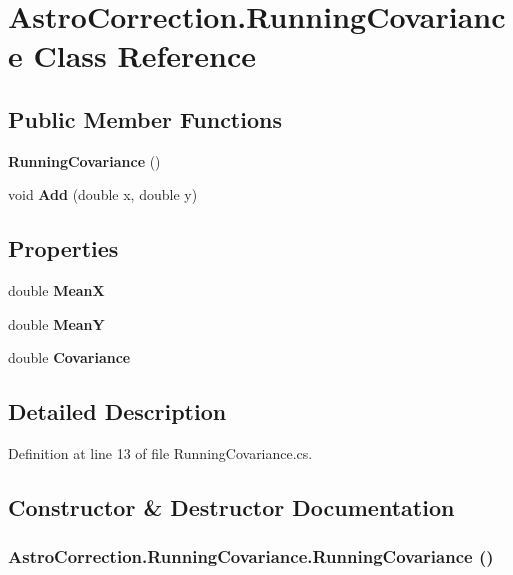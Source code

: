 \section{AstroCorrection.RunningCovariance Class Reference}
\label{class_astro_correction_1_1_running_covariance}
\subsection*{Public Member Functions}
\begin{DoxyCompactItemize}
\item 
{\bf RunningCovariance} ()
\item 
void {\bf Add} (double x, double y)
\end{DoxyCompactItemize}
\subsection*{Properties}
\begin{DoxyCompactItemize}
\item 
double {\bf MeanX}\hspace{0.3cm}{\ttfamily  [get, set]}
\item 
double {\bf MeanY}\hspace{0.3cm}{\ttfamily  [get, set]}
\item 
double {\bf Covariance}\hspace{0.3cm}{\ttfamily  [get]}
\end{DoxyCompactItemize}


\subsection{Detailed Description}


Definition at line 13 of file RunningCovariance.cs.

\subsection{Constructor \& Destructor Documentation}
\subsubsection[{RunningCovariance}]{\setlength{\rightskip}{0pt plus 5cm}AstroCorrection.RunningCovariance.RunningCovariance ()}\label{class_astro_correction_1_1_running_covariance_a10d660cf17ee3ad8f52d45848585c0e1}


